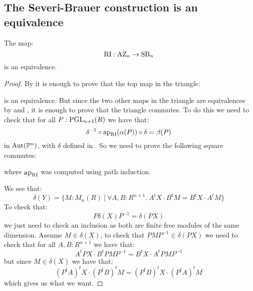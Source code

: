 \subsection{The Severi-Brauer construction is an equivalence}

\begin{proposition}\label{right-ideal-is-equivalence}
The map:
\[\mathrm{RI}:\mathrm{AZ}_n\to\mathrm{SB}_n\]
is an equivalence.
\end{proposition}

\begin{proof}
By  it is enough to prove that the top map in the triangle:
\begin{center}
\end{center}
is an equivalence. But since the two other maps in the triangle are equivalences by  and , it is enough to prove that the triangle commutes. To do this we need to check that for all $P:\operatorname{PGL}_{n+1}(R)$ we have that:
\[\delta^{-1}\circ \mathrm{ap}_{\mathrm{RI}}(\alpha(P))\circ\delta = \beta(P)\]
in $\mathrm{Aut}(\mathbb{P}^n)$, with $\delta$ defined in . So we need to prove the following square commutes:
\begin{center}
\end{center}
where $\mathrm{ap}_{\mathrm{RI}}$ was computed using path induction.

We see that:
\[\delta(Y) = \{M:M_n(R)\ |\ \forall A,B:R^{n+1}.\ A^tX\cdot B^tM = B^tX\cdot A^tM\}\]
To check that:
\[P\delta(X)P^{-1} = \delta(PX)\]
we just need to check an inclusion as both are finite free modules of the same dimension. Assume $M\in\delta(X)$, to check that $PMP^{-1}\in\delta(PX)$ we need to check that for all $A,B:R^{n+1}$ we have that:
\[A^tPX\cdot B^tPMP^{-1} = B^tX\cdot A^tPMP^{-1}\]
but since $M\in\delta(X)$ we have that:
\[(P^tA)^tX\cdot (P^tB)^tM = (P^tB)^tX\cdot (P^tA)^tM\]
which gives us what we want.
\end{proof}

